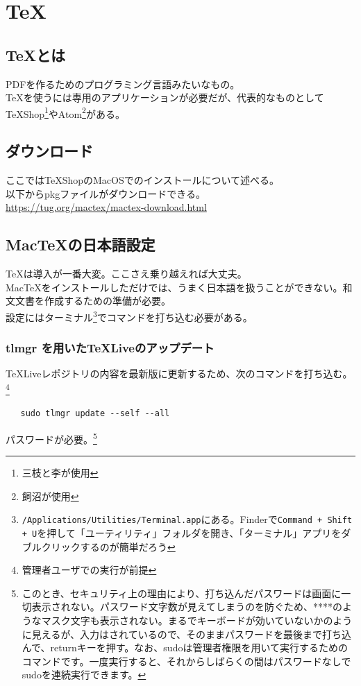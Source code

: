 \documentclass[dvipdfmx,jb5]{jreport}
\begin{document}
\section{\TeX}
\subsection{\TeX とは}
PDFを作るためのプログラミング言語みたいなもの。\\
\TeX を使うには専用のアプリケーションが必要だが、代表的なものとしてTeXShop\footnote{三枝と李が使用}やAtom\footnote{飼沼が使用}がある。
\subsection{ダウンロード}
ここではTeXShopのMacOSでのインストールについて述べる。\\
以下からpkgファイルがダウンロードできる。\\
\url{https://tug.org/mactex/mactex-download.html}
\subsection{Mac\TeX の日本語設定}
\TeX は導入が一番大変。ここさえ乗り越えれば大丈夫。\\
Mac\TeX をインストールしただけでは、うまく日本語を扱うことができない。和文文書を作成するための準備が必要。\\
設定にはターミナル\footnote{\texttt{/Applications/Utilities/Terminal.app}にある。Finderで\texttt{Command + Shift + U}を押して「ユーティリティ」フォルダを開き、「ターミナル」アプリをダブルクリックするのが簡単だろう}でコマンドを打ち込む必要がある。
\subsubsection{tlmgr を用いた\TeX Liveのアップデート}
\TeX Liveレポジトリの内容を最新版に更新するため、次のコマンドを打ち込む。\footnote{管理者ユーザでの実行が前提}
\begin{lstlisting}
   sudo tlmgr update --self --all
  \end{lstlisting}
パスワードが必要。\footnote{このとき、セキュリティ上の理由により、打ち込んだパスワードは画面に一切表示されない。パスワード文字数が見えてしまうのを防ぐため、****のようなマスク文字も表示されない。まるでキーボードが効いていないかのように見えるが、入力はされているので、そのままパスワードを最後まで打ち込んで、returnキーを押す。なお、sudoは管理者権限を用いて実行するためのコマンドです。一度実行すると、それからしばらくの間はパスワードなしでsudoを連続実行できます。}
\end{document}
